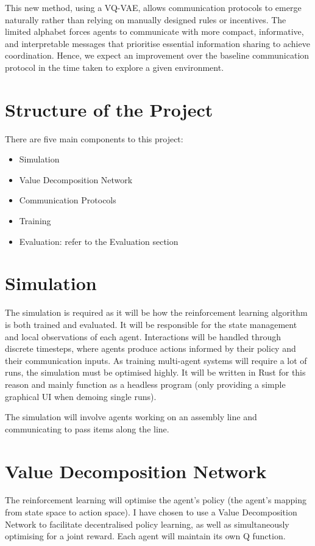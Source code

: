 \documentclass[20pt]{article}
\begin{document}
This new method, using a VQ-VAE, allows communication protocols to emerge naturally rather than relying on manually designed rules or incentives. The limited alphabet forces agents to communicate with more compact, informative, and interpretable messages that prioritise essential information sharing to achieve coordination. Hence, we expect an improvement over the baseline communication protocol in the time taken to explore a given environment.

\pagebreak
\section{Structure of the Project}
There are five main components to this project:

\begin{itemize}
\item Simulation
\item Value Decomposition Network
\item Communication Protocols
\item Training
\item Evaluation: refer to the Evaluation section
\end{itemize}

\section*{Simulation}
The simulation is required as it will be how the reinforcement learning algorithm is both trained and evaluated. It will be responsible for the state management and local observations of each agent. Interactions will be handled through discrete timesteps, where agents produce actions informed by their policy and their communication inputs.  As training multi-agent systems will require a lot of runs, the simulation must be optimised highly. It will be written in Rust for this reason and mainly function as a headless program (only providing a simple graphical UI when demoing single runs).

The simulation will involve agents working on an assembly line and communicating to pass items along the line.

\section*{Value Decomposition Network}
The reinforcement learning will optimise the agent's policy (the agent's mapping from state space to action space). I have chosen to use a Value Decomposition Network to facilitate decentralised policy learning, as well as simultaneously optimising for a joint reward. Each agent will maintain its own Q function.
\end{document}
